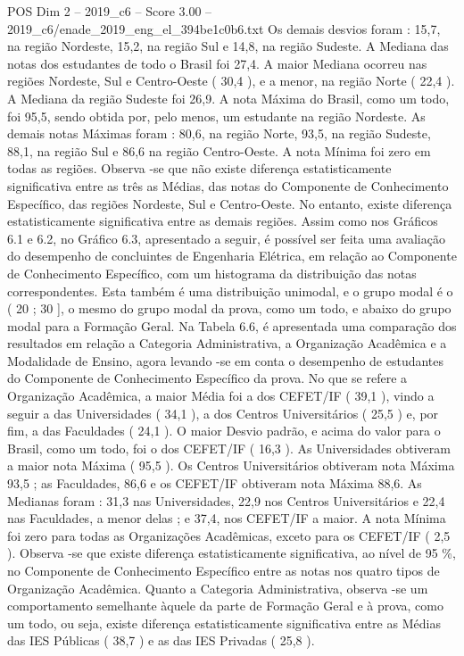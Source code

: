 \begin{textsample}{POS Dim 2 – 2019\_c6 – Score 3.00 – 2019\_c6/enade\_2019\_eng\_el\_394be1c0b6.txt}
Os demais desvios foram : 15,7, na região Nordeste, 15,2, na região Sul e 14,8, na região Sudeste.
A Mediana das notas dos estudantes de todo o Brasil foi 27,4.
A maior Mediana ocorreu nas regiões Nordeste, Sul e Centro-Oeste ( 30,4 ), e a menor, na região Norte ( 22,4 ).
A Mediana da região Sudeste foi 26,9.
A nota Máxima do Brasil, como um todo, foi 95,5, sendo obtida por, pelo menos, um estudante na região Nordeste.
As demais notas Máximas foram : 80,6, na região Norte, 93,5, na região Sudeste, 88,1, na região Sul e 86,6 na região Centro-Oeste.
A nota Mínima foi zero em todas as regiões.
Observa -se que não existe diferença estatisticamente significativa entre as três as Médias, das notas do Componente de Conhecimento Específico, das regiões Nordeste, Sul e Centro-Oeste.
No entanto, existe diferença estatisticamente significativa entre as demais regiões.
Assim como nos Gráficos 6.1 e 6.2, no Gráfico 6.3, apresentado a seguir, é possível ser feita uma avaliação do desempenho de concluintes de Engenharia Elétrica, em relação ao Componente de Conhecimento Específico, com um histograma da distribuição das notas correspondentes.
Esta também é uma distribuição unimodal, e o grupo modal é o ( 20 ; 30 ], o mesmo do grupo modal da prova, como um todo, e abaixo do grupo modal para a Formação Geral.
Na Tabela 6.6, é apresentada uma comparação dos resultados em relação a Categoria Administrativa, a Organização Acadêmica e a Modalidade de Ensino, agora levando -se em conta o desempenho de estudantes do Componente de Conhecimento Específico da prova.
No que se refere a Organização Acadêmica, a maior Média foi a dos CEFET/IF ( 39,1 ), vindo a seguir a das Universidades ( 34,1 ), a dos Centros Universitários ( 25,5 ) e, por fim, a das Faculdades ( 24,1 ).
O maior Desvio padrão, e acima do valor para o Brasil, como um todo, foi o dos CEFET/IF ( 16,3 ).
As Universidades obtiveram a maior nota Máxima ( 95,5 ).
Os Centros Universitários obtiveram nota Máxima 93,5 ; as Faculdades, 86,6 e os CEFET/IF obtiveram nota Máxima 88,6.
As Medianas foram : 31,3 nas Universidades, 22,9 nos Centros Universitários e 22,4 nas Faculdades, a menor delas ; e 37,4, nos CEFET/IF a maior.
A nota Mínima foi zero para todas as Organizações Acadêmicas, exceto para os CEFET/IF ( 2,5 ).
Observa -se que existe diferença estatisticamente significativa, ao nível de 95 \%, no Componente de Conhecimento Específico entre as notas nos quatro tipos de Organização Acadêmica.
Quanto a Categoria Administrativa, observa -se um comportamento semelhante àquele da parte de Formação Geral e à prova, como um todo, ou seja, existe diferença estatisticamente significativa entre as Médias das IES Públicas ( 38,7 ) e as das IES Privadas ( 25,8 ).

\end{textsample}
